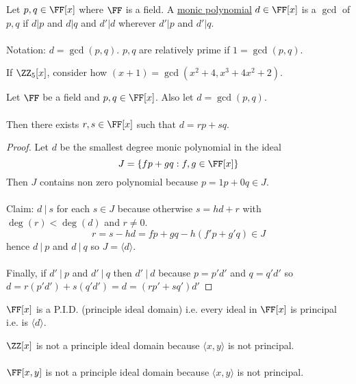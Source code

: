 \documentclass[class=scrartcl, crop=false]{standalone}
\begin{document}
\begin{definition}
  Let $p, q \in \FF[x]$ where $\FF$ is a field. A \ul{monic polynomial} $d \in \FF[x]$ is a $\gcd$ of $p, q$ if $d | p$ and $d | q$ and $d' | d$ wherever $d' | p$ and $d' | q$.
  \\\\
  Notation: $d = \gcd(p, q)$. $p, q$ are relatively prime if $1 = \gcd(p, q)$.
\end{definition} 

\begin{example}
  If $\ZZ_5[x]$, consider how $(x + 1) = \gcd(x^2 + 4, x^3 + 4x^2 + 2)$.
\end{example} 

\begin{proposition}
  Let $\FF$ be a field and $p, q \in \FF[x]$. Also let $d = \gcd(p, q)$.
  \\\\
  Then there exists $r, s \in \FF[x]$ such that $d = rp + sq$.
  \begin{proof}
    Let $d$ be the smallest degree monic polynomial in the ideal 
    \[J = \{fp + gq : f, g \in \FF[x]\}\]
    Then $J$ contains non zero polynomial because $p = 1 p + 0q \in J$.
    \\\\
    Claim: $d \ | \ s$ for each $s \in J$ because otherwise  $s = hd + r$ with $\deg(r) < \deg(d)$ and $r \neq 0$.
    \[
      r = s - hd = fp + gq - h(f'p + g'q) \in J
    \]
    hence  $d \ | \ p$ and $d \ | \ q$ so $J = \langle d \rangle $.
    \\\\
    Finally, if $d' \ | \ p$ and $d' \ | \ q$ then $d' \ | \ d$ because $p = p'd'$ and $q = q'd'$ so $d = r(p'd') + s(q'd') = d = (rp' + sq')d'$ 
  \end{proof} 
\end{proposition} 

\begin{theorem}
  $\FF[x]$ is a P.I.D. (principle ideal domain) i.e. every ideal in $\FF[x]$ is principal i.e. is $\langle d \rangle $.
\end{theorem} 
\begin{example}
  $\ZZ[x]$ is not a principle ideal domain because $\langle x, y \rangle $ is not principal.
  \\\\
  $\FF[x, y]$ is not a principle ideal domain because $\langle x, y \rangle $ is not principal.
\end{example} 
\end{document}
